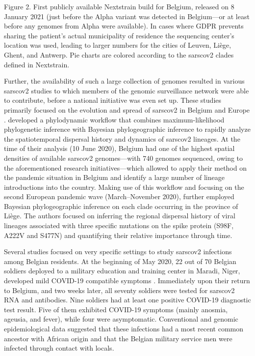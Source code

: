 Figure 2. First publicly available Nextstrain build for Belgium, released on 8 January 2021 (just before the Alpha variant was detected in Belgium—or at least before any genomes from Alpha were available).
In cases where GDPR prevents sharing the patient's actual municipality of residence the sequencing center's location was used, leading to larger numbers for the cities of Leuven, Li\`{e}ge, Ghent, and Antwerp.
Pie charts are colored according to the \gls{sarscov2} clades defined in Nextstrain.


Further, the availability of such a large collection of genomes resulted in various \gls{sarscov2} studies to which members of the genomic surveillance network were able to contribute, before a national initiative was even set up.
These studies primarily focused on the evolution and spread of \gls{sarscov2} in Belgium and Europe \citep{alm2020geographical}.
\citet{dellicour2021phylodynamic} developed a phylodynamic workflow that combines maximum-likelihood phylogenetic inference with Bayesian phylogeographic inference to rapidly analyze the spatiotemporal dispersal history and dynamics of \gls{sarscov2} lineages.
At the time of their analysis (10 June 2020), Belgium had one of the highest spatial densities of available \gls{sarscov2} genomes—with 740 genomes sequenced, owing to the aforementioned research initiatives—which allowed \citet{dellicour2021phylodynamic} to apply their method on the pandemic situation in Belgium and identify a large number of lineage introductions into the country.
Making use of this workflow and focusing on the second European pandemic wave (March--November 2020), \citet{bollen2021exploiting} further employed Bayesian phylogeographic inference on each clade occurring in the province of Li\`{e}ge.
The authors focused on inferring the regional dispersal history of viral lineages associated with three specific mutations on the spike protein (S98F, A222V and S477N) and quantifying their relative importance through time.

Several studies focused on very specific settings to study \gls{sarscov2} infections among Belgian residents.
At the beginning of May 2020, 22 out of 70 Belgian soldiers deployed to a military education and training center in Maradi, Niger, developed mild COVID-19 compatible symptoms \citep{pirnay2020study}.
Immediately upon their return to Belgium, and two weeks later, all seventy soldiers were tested for \gls{sarscov2} RNA and antibodies.
Nine soldiers had at least one positive COVID-19 diagnostic test result.
Five of them exhibited COVID-19 symptoms (mainly anosmia, ageusia, and fever), while four were asymptomatic.
Conventional and genomic epidemiological data suggested that these infections had a most recent common ancestor with African origin and that the Belgian military service men were infected through contact with locals.

